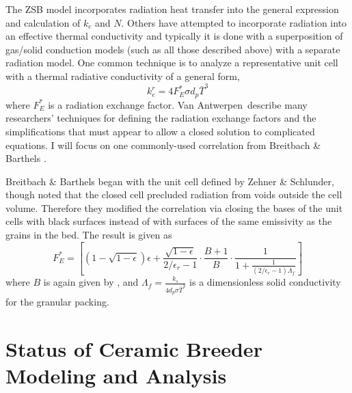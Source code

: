 The ZSB model incorporates radiation heat transfer into the general expression and calculation of $k_c$ and $N$. Others have attempted to incorporate radiation into an effective thermal conductivity and typically it is done with a superposition of gas/solid conduction models (such as all those described above) with a separate radiation model. One common technique is to analyze a representative unit cell with a thermal radiative conductivity of a general form,
\begin{equation}
     k_e^r = 4 F_E^*\sigma d_p \bar{T}^3
\end{equation} 
where $F_E^*$ is a radiation exchange factor. Van Antwerpen\etal~describe many researchers' techniques for defining the radiation exchange factors and the simplifications that must appear to allow a closed solution to complicated equations. I will focus on one commonly-used correlation from Breitbach \& Barthels \cite{breitbach1980radiant}.

Breitbach \& Barthels began with the unit cell defined by Zehner \& Schlunder, though noted that the closed cell precluded radiation from voids outside the cell volume. Therefore they modified the correlation via closing the bases of the unit cells with black surfaces instead of with surfaces of the same emissivity as the grains in the bed. The result is given as \cite{breitbach1980radiant}
\begin{equation}
    F_E^* = \left[\left(1-\sqrt{1-\epsilon}\right)\epsilon + \frac{\sqrt{1-\epsilon}}{2/\epsilon_r - 1}\cdot\frac{B+1}{B}\cdot\frac{1}{1+\frac{1}{(2/\epsilon_r - 1)\Lambda_f}} \right]
\end{equation}
where $B$ is again given by , and $\Lambda_f = \frac{k_s}{4d_p\sigma\bar{T}^3}$ is a dimensionless solid conductivity for the granular packing.



%
%
\section{Status of Ceramic Breeder Modeling and Analysis}\label{sec:modeling-state}


